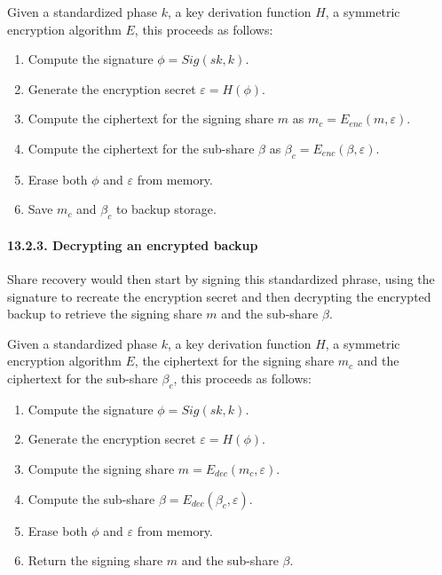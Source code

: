 \documentclass[
]{article}
\providecommand{\tightlist}{%
  \setlength{\itemsep}{0pt}\setlength{\parskip}{0pt}}
\begin{document}
Given a standardized phase \(k\), a key derivation function \(H\), a
symmetric encryption algorithm \(E\), this proceeds as follows:

\begin{enumerate}
\def\labelenumi{\arabic{enumi}.}
\tightlist
\item
  Compute the signature \(\phi = Sig(sk, k)\).
\item
  Generate the encryption secret \(\varepsilon = H(\phi)\).
\item
  Compute the ciphertext for the signing share \(m\) as
  \(m_c = E_{enc}(m, \varepsilon)\).
\item
  Compute the ciphertext for the sub-share \(\beta\) as
  \(\beta _c = E_{enc}(\beta, \varepsilon)\).
\item
  Erase both \(\phi\) and \(\varepsilon\) from memory.
\item
  Save \(m_c\) and \(\beta _c\) to backup storage.
\end{enumerate}

\hypertarget{share-recovery-backup-decrypt}{%
\paragraph{13.2.3. Decrypting an encrypted
backup}\label{share-recovery-backup-decrypt}}

Share recovery would then start by signing this standardized phrase,
using the signature to recreate the encryption secret and then
decrypting the encrypted backup to retrieve the signing share \(m\) and
the sub-share \(\beta\).

Given a standardized phase \(k\), a key derivation function \(H\), a
symmetric encryption algorithm \(E\), the ciphertext for the signing
share \(m_c\) and the ciphertext for the sub-share \(\beta _c\), this
proceeds as follows:

\begin{enumerate}
\def\labelenumi{\arabic{enumi}.}
\tightlist
\item
  Compute the signature \(\phi = Sig(sk, k)\).
\item
  Generate the encryption secret \(\varepsilon = H(\phi)\).
\item
  Compute the signing share \(m = E_{dec}(m_c, \varepsilon)\).
\item
  Compute the sub-share \(\beta = E_{dec}(\beta _c, \varepsilon)\).
\item
  Erase both \(\phi\) and \(\varepsilon\) from memory.
\item
  Return the signing share \(m\) and the sub-share \(\beta\).
\end{enumerate}
\end{document}
